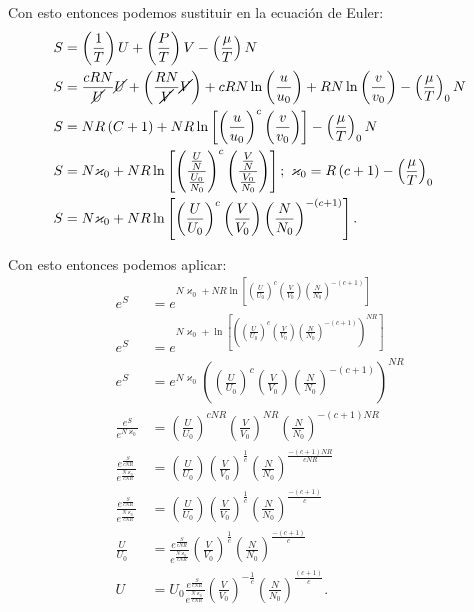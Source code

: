 \documentclass{report}
\begin{document}
Con esto entonces podemos sustituir en la ecuación de Euler:
\begin{align*}
  S &= \left( \frac{1}{T} \right) U + \left( \frac{P}{T} \right) V - \left( \frac{\mu}{T} \right) N \\
  S &= \frac{cRN}{\cancel{U}}\cancel{U} + \left( \frac{RN}{\cancel{V}}\cancel{V} \right) + cRN \ln\left( \frac{u}{u_0} \right) + RN \ln\left( \frac{v}{v_0} \right) - \left( \frac{\mu}{T} \right)_{0}N  \\
  S &= NR\left( C + 1 \right) + NR\ln\left[ \left( \frac{u}{u_0} \right)^{c}\left( \frac{v}{v_0} \right)  \right] - \left( \frac{\mu}{T} \right)_0 N \\
  S &= N\varkappa_0 + NR\ln\left[ \left( \frac{\frac{U}{N}}{\frac{U_0}{N_0}} \right)^{c}\left( \frac{\frac{V}{N}}{\frac{V_{0}}{N_0}} \right) \right] ;\ \varkappa_0 = R\left( c + 1 \right) - \left( \frac{\mu}{T} \right)_{0} \\
  S &= N\varkappa_0 + NR\ln\left[ \left( \frac{U}{U_0} \right)^{c} \left( \frac{V}{V_0} \right) \left( \frac{N}{N_0} \right)^{-\left( c + 1 \right) } \right]
.\end{align*}

Con esto entonces podemos aplicar:
\begin{align*}
  e^{S} &= e^{N\varkappa_0 + NR\ln\left[ \left( \frac{U}{U_0} \right)^{c} \left( \frac{V}{V_0} \right) \left( \frac{N}{N_0} \right)^{-\left( c + 1 \right) } \right]} \\
  e^{S} &= e^{N\varkappa_0 + \ln\left[ \left( \left( \frac{U}{U_0} \right)^{c} \left( \frac{V}{V_0} \right) \left( \frac{N}{N_0} \right)^{-\left( c + 1 \right) } \right)^{NR}\right]} \\
e^{S} &= e^{N\varkappa_0}\left( \left( \frac{U}{U_0} \right)^{c} \left( \frac{V}{V_0} \right) \left( \frac{N}{N_0} \right)^{-\left( c + 1 \right) } \right)^{NR}\\
\frac{e^{S}}{e^{N\varkappa_0}} &= \left( \frac{U}{U_0} \right)^{cNR}\left( \frac{V}{V_0} \right)^{NR}\left( \frac{N}{N_0} \right)^{-\left( c + 1 \right) NR} \\
\frac{e^{\frac{S}{cNR}}}{e^{\frac{N\varkappa_0}{cNR}}} &= \left( \frac{U}{U_0} \right)\left( \frac{V}{V_0} \right)^{\frac{1}{c}}\left( \frac{N}{N_0} \right)^{\frac{-\left( c + 1 \right) NR}{cNR}} \\
\frac{e^{\frac{S}{cNR}}}{e^{\frac{N\varkappa_0}{cNR}}} &= \left( \frac{U}{U_0} \right)\left( \frac{V}{V_0} \right)^{\frac{1}{c}}\left( \frac{N}{N_0} \right)^{\frac{-\left( c + 1 \right)}{c}} \\
\frac{U}{U_0} &= \frac{e^{\frac{S}{cNR}}}{e^{\frac{N\varkappa_0}{cNR}}} \left( \frac{V}{V_0} \right)^{\frac{1}{c}}\left( \frac{N}{N_0} \right)^{\frac{-\left( c + 1 \right)}{c}} \\
U &= U_0\frac{e^{\frac{S}{cNR}}}{e^{\frac{N\varkappa_0}{cNR}}} \left( \frac{V}{V_0} \right)^{-\frac{1}{c}}\left( \frac{N}{N_0} \right)^{\frac{\left( c + 1 \right)}{c}}
.\end{align*}
\end{document}
